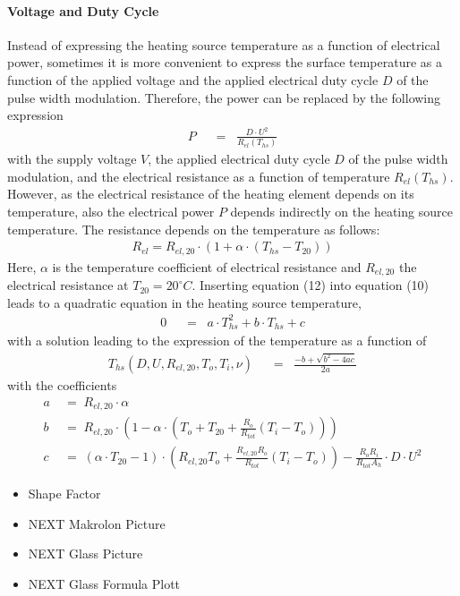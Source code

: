\paragraph{Voltage and Duty Cycle}
Instead of expressing the heating source temperature as a function of electrical power, sometimes it is more convenient to express the surface temperature as a function of the applied voltage and the applied electrical duty cycle \(D\) of the pulse width modulation. Therefore, the power can be replaced by the following expression
\begin{align}
P \;\; &= \;\; \frac{D\cdot U^2}{R_{el}(T_{hs})}
\end{align}
with the supply voltage \(V\), the applied electrical duty cycle \(D\) of the pulse width modulation, and the electrical resistance as a function of temperature \(R_{el}(T_{hs})\). However, as the electrical resistance of the heating element depends on its temperature, also the electrical power \(P\) depends indirectly on the heating source temperature. The resistance depends on the temperature as follows:
\begin{align}
R_{el} = R_{el,20}\cdot(1 + \alpha\cdot (T_{hs}-T_{20}))
\end{align}
Here, \(\alpha\) is the temperature coefficient of electrical resistance and \(R_{el,20}\) the electrical resistance at \(T_{20} = 20^{\circ}C\). Inserting equation (12) into equation (10) leads to a quadratic equation in the heating source temperature,
\begin{align}
0 \;\; &= \;\; a\cdot T_{hs}^2 + b\cdot T_{hs} + c  
\end{align}
with a solution leading to the expression of the temperature as a function of 
\begin{align}
T_{hs}(D,U,R_{el,20},T_o,T_i,\nu) \;\; &= \;\; \frac{-b + \sqrt{b^2-4ac}}{2a}
\end{align}
with the coefficients
\begin{align}
a \; &= \; R_{el,20}\cdot \alpha \\
b \; &= \; R_{el,20}\cdot\left(1-\alpha\cdot(T_o+T_{20}+\frac{R_o}{R_{tot}}(T_i-T_o))\right) \\
c \; &= \; (\alpha\cdot T_{20}-1)\cdot\left(R_{el,20}T_o + \frac{R_{el,20}R_o}{R_{tot}}(T_i - T_o)\right) - \frac{R_oR_i}{R_{tot}A_h}\cdot D\cdot U^2
\end{align}


\begin{itemize}
\item Shape Factor
\item NEXT Makrolon Picture
\item NEXT Glass Picture
\item NEXT Glass Formula Plott
\end{itemize}


